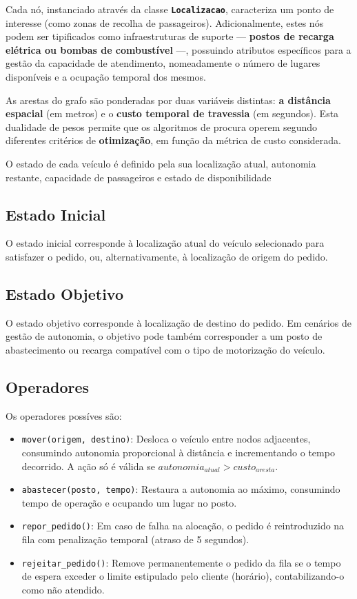 \documentclass[11pt, a4paper, fleqn]{article}
\begin{document}
	Cada nó, instanciado através da classe \textbf{\texttt{Localizacao}}, caracteriza um ponto de interesse (como zonas de recolha de passageiros). Adicionalmente, estes nós podem ser tipificados como infraestruturas de suporte — \textbf{postos de recarga elétrica ou bombas de combustível} —, possuindo atributos específicos para a gestão da capacidade de atendimento, nomeadamente o número de lugares disponíveis e a ocupação temporal dos mesmos.
	
	As arestas do grafo são ponderadas por duas variáveis distintas: \textbf{a distância espacial} (em metros) e o \textbf{custo temporal de travessia} (em segundos). Esta dualidade de pesos permite que os algoritmos de procura operem segundo diferentes critérios de \textbf{otimização}, em função da métrica de custo considerada.
	
	O estado de cada veículo é definido pela sua localização atual, autonomia restante, capacidade de passageiros e estado de disponibilidade
	
	
	\subsection{Estado Inicial}
	
	O estado inicial corresponde à localização atual do veículo selecionado para satisfazer o pedido, ou, alternativamente, à localização de origem do pedido.
	
	\subsection{Estado Objetivo}
	
	O estado objetivo corresponde à localização de destino do pedido. Em cenários de gestão de autonomia, o objetivo pode também corresponder a um posto de abastecimento ou recarga compatível com o tipo de motorização do veículo.
	
	\subsection{Operadores}
	
	Os operadores possíves são:
	\begin{itemize}
		\item \texttt{mover(origem, destino)}: Desloca o veículo entre nodos adjacentes, consumindo autonomia proporcional à distância e incrementando o tempo decorrido. A ação só é válida se $autonomia_{atual} > custo_{aresta}$.
		\item \texttt{abastecer(posto, tempo)}: Restaura a autonomia ao máximo, consumindo tempo de operação e ocupando um lugar no posto.
		\item \texttt{repor\_pedido()}: Em caso de falha na alocação, o pedido é reintroduzido na fila com penalização temporal (atraso de 5 segundos).
		\item \texttt{rejeitar\_pedido()}: Remove permanentemente o pedido da fila se o tempo de espera exceder o limite estipulado pelo cliente (horário), contabilizando-o como não atendido.
	\end{itemize}
	
\end{document}

